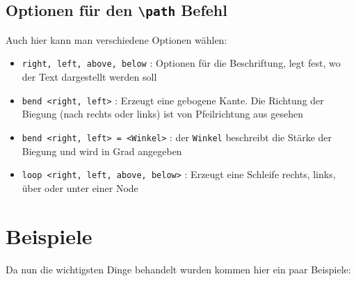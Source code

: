 \documentclass{article}
\begin{document}
	\subsection{Optionen für den \texttt{\textbackslash path} Befehl}
		Auch hier kann man verschiedene Optionen wählen:
		\begin{itemize}
			\item \texttt{right, left, above, below} : Optionen für die Beschriftung, legt fest, wo der Text dargestellt werden soll
			\item \texttt{bend <right, left>} : Erzeugt eine gebogene Kante. Die Richtung der Biegung (nach rechts oder links) ist von Pfeilrichtung aus gesehen
			\item \texttt{bend <right, left> = <Winkel>} : der \texttt{Winkel} beschreibt die Stärke der Biegung und wird in Grad angegeben
			\item \texttt{loop <right, left, above, below>} : Erzeugt eine Schleife rechts, links, über oder unter einer Node
		\end{itemize}
	\section{Beispiele}
		Da nun die wichtigsten Dinge behandelt wurden kommen hier ein paar Beispiele:
\end{document}
